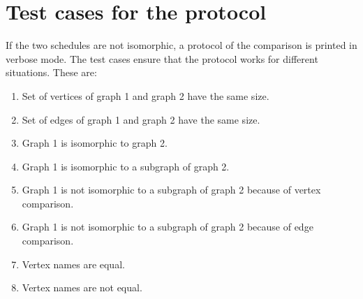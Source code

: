 \documentclass[12pt,a4paper]{report}
\begin{document}
\section{Test cases for the protocol}
If the two schedules are not isomorphic, a protocol of the comparison is printed in verbose mode. The test cases
ensure that the protocol works for different situations. These are:
\begin{enumerate}
  \item Set of vertices of graph 1 and graph 2 have the same size.
  \item Set of edges of graph 1 and graph 2 have the same size.
  \item Graph 1 is isomorphic to graph 2.
  \item Graph 1 is isomorphic to a subgraph of graph 2.
  \item Graph 1 is not isomorphic to a subgraph of graph 2 because of vertex comparison.
  \item Graph 1 is not isomorphic to a subgraph of graph 2 because of edge comparison.
  \item Vertex names are equal.
  \item Vertex names are not equal.
\end{enumerate}
\end{document}
